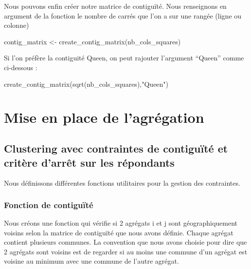 \documentclass[
]{article}
\newenvironment{Shaded}{\begin{snugshade}}{\end{snugshade}}
\newcommand{\FunctionTok}[1]{\textcolor[rgb]{0.00,0.00,0.00}{#1}}
\newcommand{\NormalTok}[1]{#1}
\newcommand{\OtherTok}[1]{\textcolor[rgb]{0.56,0.35,0.01}{#1}}
\newcommand{\StringTok}[1]{\textcolor[rgb]{0.31,0.60,0.02}{#1}}
\begin{document}
Nous pouvons enfin créer notre matrice de contiguïté. Nous renseignons
en argument de la fonction le nombre de carrés que l'on a sur une rangée
(ligne ou colonne)

\begin{Shaded}
\begin{Highlighting}[]
\NormalTok{contig\_matrix }\OtherTok{\textless{}{-}} \FunctionTok{create\_contig\_matrix}\NormalTok{(nb\_cols\_squares)}
\end{Highlighting}
\end{Shaded}

Si l'on préfère la contiguité Queen, on peut rajouter l'argument
``Queen'' comme ci-dessous :

\begin{Shaded}
\begin{Highlighting}[]
\FunctionTok{create\_contig\_matrix}\NormalTok{(}\FunctionTok{sqrt}\NormalTok{(nb\_cols\_squares),}\StringTok{"Queen"}\NormalTok{)}
\end{Highlighting}
\end{Shaded}

\hypertarget{mise-en-place-de-lagruxe9gation}{%
\section{Mise en place de
l'agrégation}\label{mise-en-place-de-lagruxe9gation}}

\hypertarget{clustering-avec-contraintes-de-contiguuxeftuxe9-et-crituxe8re-darruxeat-sur-les-ruxe9pondants}{%
\subsection{Clustering avec contraintes de contiguïté et critère d'arrêt
sur les
répondants}\label{clustering-avec-contraintes-de-contiguuxeftuxe9-et-crituxe8re-darruxeat-sur-les-ruxe9pondants}}

Nous définissons différentes fonctions utilitaires pour la gestion des
contraintes.

\hypertarget{fonction-de-contiguuxeftuxe9}{%
\subsubsection{Fonction de
contiguïté}\label{fonction-de-contiguuxeftuxe9}}

Nous créons une fonction qui vérifie si 2 agrégats i et j sont
géographiquement voisins selon la matrice de contiguïté que nous avons
définie. Chaque agrégat contient plusieurs communes. La convention que
nous avons choisie pour dire que 2 agrégats sont voisins est de regarder
si au moins une commune d'un agrégat est voisine au minimum avec une
commune de l'autre agrégat.
\end{document}
